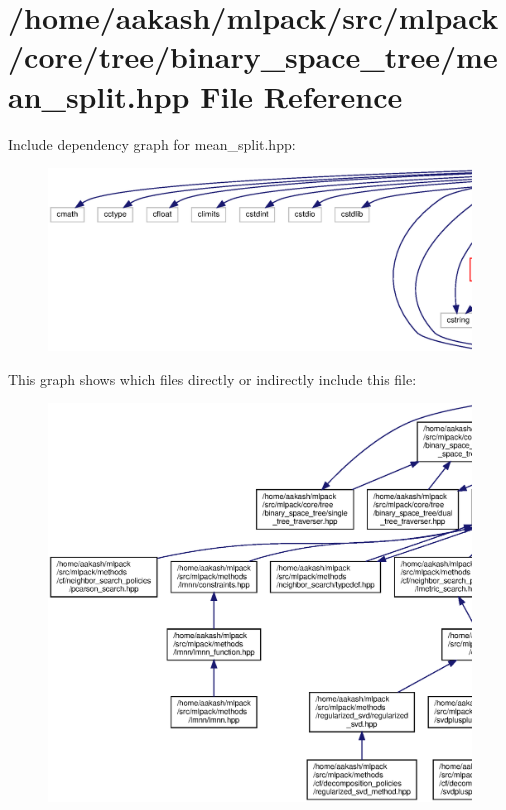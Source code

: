 \section{/home/aakash/mlpack/src/mlpack/core/tree/binary\+\_\+space\+\_\+tree/mean\+\_\+split.hpp File Reference}
\label{mean__split_8hpp}
Include dependency graph for mean\+\_\+split.\+hpp\+:
\nopagebreak
\begin{figure}[H]
\begin{center}
\leavevmode
\includegraphics[width=350pt]{mean__split_8hpp__incl}
\end{center}
\end{figure}
This graph shows which files directly or indirectly include this file\+:
\nopagebreak
\begin{figure}[H]
\begin{center}
\leavevmode
\includegraphics[width=350pt]{mean__split_8hpp__dep__incl}
\end{center}
\end{figure}
